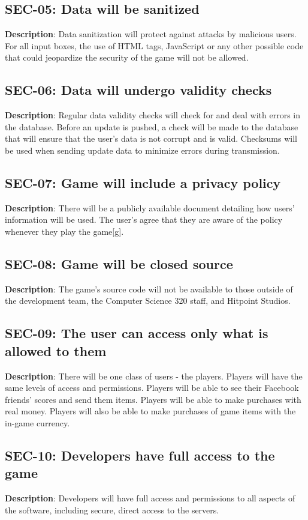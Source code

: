 \subsection{SEC-05: Data will be sanitized}
\textbf{Description}: Data sanitization will protect against attacks by malicious
users. For all input boxes, the use of HTML tags, JavaScript or any
other possible code that could jeopardize the security of the game
will not be allowed.
\subsection{SEC-06: Data will undergo validity checks}
\textbf{Description}: Regular data validity checks will check for and deal
with errors in the database. Before an update is pushed, a check will
be made to the database that will ensure that the user\textquoteright{}s
data is not corrupt and is valid. Checksums will be used when sending
update data to minimize errors during transmission.
\subsection{SEC-07: Game will include a privacy policy}
\textbf{Description}: There will be a publicly available document detailing
how users\textquoteright{} information will be used. The user\textquoteright{}s
agree that they are aware of the policy whenever they play the game{[}g{]}.
\subsection{SEC-08: Game will be closed source}
\textbf{Description}: The game\textquoteright{}s source code will not be available
to those outside of the development team, the Computer Science 320
staff, and Hitpoint Studios.
\subsection{SEC-09: The user can access only what is allowed to them}
\textbf{Description}: There will be one class of users - the players. Players
will have the same levels of access and permissions. Players will
be able to see their Facebook friends\textquoteright{} scores and
send them items. Players will be able to make purchases with real
money. Players will also be able to make purchases of game items with
the in-game currency.
\subsection{SEC-10: Developers have full access to the game}
\textbf{Description}: Developers will have full access and permissions to all
aspects of the software, including secure, direct access to the servers.
